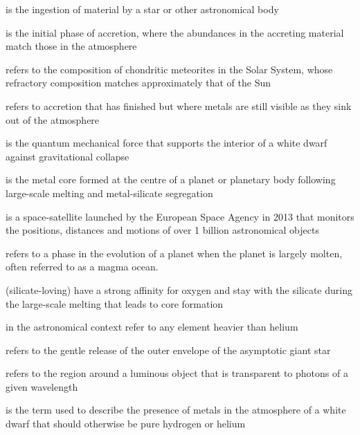 \documentclass[onecolumn,authoryear]{els-mrw}
\begin{document}
\begin{glossary}[Glossary]


 is the ingestion of material by a star or other astronomical body

 is the initial phase of accretion, where the abundances in the accreting material match those in the atmosphere

 refers to the composition of chondritic meteorites in the Solar System, whose refractory composition matches approximately that of the Sun

 refers to accretion that has finished but where metals are still visible as they sink out of the atmosphere 


 is the quantum mechanical force that supports the interior of a white dwarf against gravitational collapse



 is the metal core formed at the centre of a planet or planetary body following large-scale melting and metal-silicate segregation 

 is a space-satellite launched by the European Space Agency in 2013 that monitors the positions, distances and motions of over 1 billion astronomical objects 



 refers to a phase in the evolution of a planet when the planet is largely molten, often referred to as a magma ocean. 


 (silicate-loving) have a strong affinity for oxygen and stay with the silicate during the large-scale melting that leads to core formation



 in the astronomical context refer to any element heavier than helium 

 refers to the gentle release of the outer envelope of the asymptotic giant star


 refers to the region around a luminous object that is transparent to photons of a given wavelength 



 is the term used to describe the presence of metals in the atmosphere of a white dwarf that should otherwise be pure hydrogen or helium 




\end{glossary}
\end{document}
